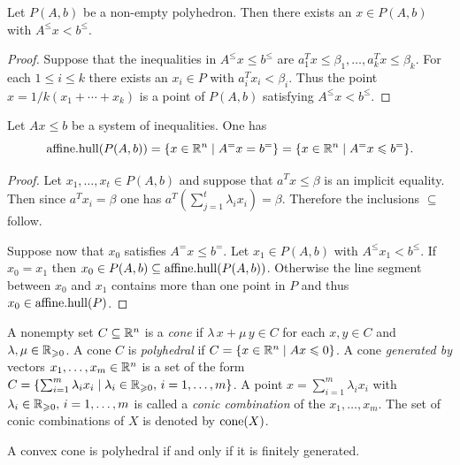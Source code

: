 \begin{lemma}
  \label{po:lem:3}
  Let $P(A,b)$ be a non-empty polyhedron.
  Then there exists an $x \in P(A,b)$ with $A^\leq x<b^\leq$. 
\end{lemma}
\begin{proof}
  Suppose that the inequalities in  $A^\leq x\leq b^\leq$ are $a_1^Tx\leq\beta_1
  ,\ldots,a_k^Tx\leq\beta_k$. For each $1\leq i\leq k$ there exists an $x_i \in P$ with
  $a_i^Tx_i<\beta_i$. Thus the point $x = 1/k (x_1+\cdots+x_k)$ is a point of
  $P(A,b)$ satisfying  $A^\leq x<b^\leq$. 
\end{proof}


\begin{lemma}
  \label{po:lem:2}
  Let $Ax\leq b$ be a system of inequalities. One has 
  \begin{displaymath}
    \mathrm{affine.hull}(P(A,b)) = \{ x \in \mathbb{R}^n \mid A^=x = b^=\} = \{ x \in \mathbb{R}^n \mid A^=x\leqslant b^=\}.
  \end{displaymath}
\end{lemma}
\begin{proof}
  Let $x_1,\ldots,x_t \in P(A,b)$ and suppose that $a^Tx\leq\beta$ is an
  implicit equality. Then since $a^Tx_i = \beta$ one has
  $a^T(\sum_{j=1}^t\lambda_ix_i) = \beta$. Therefore the inclusions $\subseteq$
  follow. 

  Suppose now that $x_0$ satisfies $A^=x\leq b^=$. Let $x_1 \in P(A,b)$
  with $A^\leq x_1<b^\leq$. If $x_0=x_1$ then $x_0 \in P(A,b) \subseteq
  \mathrm{affine.hull}(P(A,b))$.  Otherwise the line segment between $x_0$ and
  $x_1$ contains more than one point in $P$ and thus $x_0 \in
  \mathrm{affine.hull}(P)$. 
\end{proof}








A nonempty set  $C\subseteq\mathbb{R}^n$ is a \emph{cone} if $\lambda\, x + \mu\,y \in C$
for each $x,y\in C$ and $\lambda,\mu\in \mathbb{R}_{\geqslant0}$. A cone  $C$ is \emph{polyhedral}
if $C = \{ x \in \mathbb{R}^n \mid Ax\leqslant0\}$. A cone \emph{generated by} vectors
$x_1,\ldots,x_m \in \mathbb{R}^n$ is a set of the form $C = \{ \sum_{i=1}^m \lambda_i x_i
\mid \lambda_i\in \mathbb{R}_{\geqslant0}, \, i=1,\ldots,m\}$.   A point $x = \sum_{i=1}^m \lambda_i x_i$
with  $\lambda_i\in \mathbb{R}_{\geqslant0}, \, i=1,\ldots,m$ is called a \emph{conic
  combination}   of the $x_1,\ldots,x_m$. The set of conic combinations of
$X$ is denoted by $\mathrm{cone}(X)$. 


\begin{theorem}
  \label{po:thr:3}
  A convex cone is polyhedral if and only if it is finitely
  generated. 
\end{theorem}


